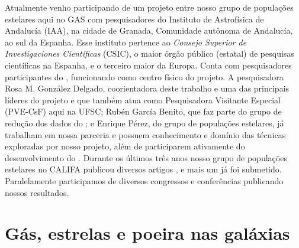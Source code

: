Atualmente venho participando de um projeto entre nosso grupo de populações estelares aqui no GAS
com pesquisadores do Instituto de Astrofísica de Andalucía (IAA), na cidade de Granada, Comunidade
autônoma de Andalucía, ao sul da Espanha. Esse instituto pertence ao {\em Consejo Superior de
Investigaciones Científicas} (CSIC), o maior órgão público (estatal) de pesquisas científicas na
Espanha, e o terceiro maior da Europa. Conta com pesquisadores participantes do \PCAL
\citep[][]{Sanchez.etal.2012a}, funcionando como centro físico do projeto. A pesquisadora Rosa M.
González Delgado, coorientadora deste trabalho e uma das principais líderes do projeto e que também
atua como Pesquisadora Visitante Especial (PVE-CsF) aqui na UFSC; Rubén García Benito, que faz parte
do grupo de redução dos dados do \CALS; e Enrique Pérez, do grupo de populações estelares, já
trabalham em nossa parceria e possuem conhecimento e domínio das técnicas exploradas por nosso
projeto, além de participarem ativamente do desenvolvimento do \PCAL. Durante os últimos três anos
nosso grupo de populações estelares no CALIFA publicou diversos artigos \citep[e.g.,
][]{Perez.etal.2013a, GonzalezDelgado.etal.2014a, GonzalezDelgado.etal.2014b,
GonzalezDelgado.etal.2015a}, e mais um já foi submetido. Paralelamente participamos de diversos
congressos e conferências publicando nossos resultados.


\section{Gás, estrelas e poeira nas galáxias}
\label{sec:intro:galaxias}

